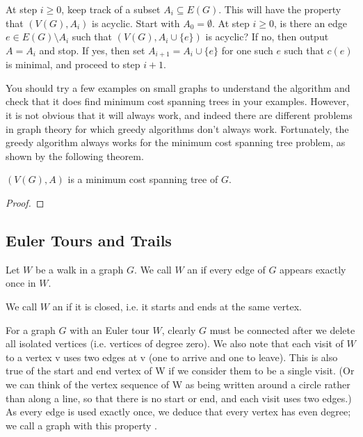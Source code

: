 \begin{theorem}
At step $i\ge0$, keep track of a subset $A_i\subseteq E(G)$. This will have the property that $(V(G),A_i)$ is acyclic. Start with $A_0=\emptyset$. At step $i\ge0$, is there an edge $e\in E(G)\setminus A_i$ such that $(V(G),A_i\cup\{e\})$ is acyclic? If no, then output $A=A_i$ and stop. If yes, then set $A_{i+1}=A_i\cup\{e\}$ for one such $e$ such that $c(e)$ is minimal, and proceed to step $i+1$.
\end{theorem}

You should try a few examples on small graphs to understand the algorithm and check that it does find minimum cost spanning trees in your examples. However, it is not obvious that it will always work, and indeed there are different problems in graph theory for which greedy algorithms don't always work. Fortunately, the greedy algorithm always works for the minimum cost spanning tree problem, as shown by the following theorem.

\begin{theorem}
$(V(G),A)$ is a minimum cost spanning tree of $G$.
\end{theorem}

\begin{proof}

\end{proof}

\subsection{Euler Tours and Trails}
\begin{definition}
Let $W$ be a walk in a graph $G$. We call $W$ an  if every edge of $G$ appears exactly once in $W$. 

We call $W$ an  if it is closed, i.e. it starts and ends at the same vertex.
\end{definition}

For a graph $G$ with an Euler tour $W$, clearly $G$ must be connected after we delete all isolated vertices (i.e. vertices of degree zero). We also note that each visit of $W$ to a vertex v uses two edges at v (one to arrive and one to leave). This is also true of the start and end vertex of W if we consider them to be a single visit. (Or we can think of the vertex sequence of W as being written around a circle rather than along a line, so that there is no start or end, and each visit uses two edges.) As every edge is used exactly once, we deduce that every vertex has even degree; we call a graph with this property .

